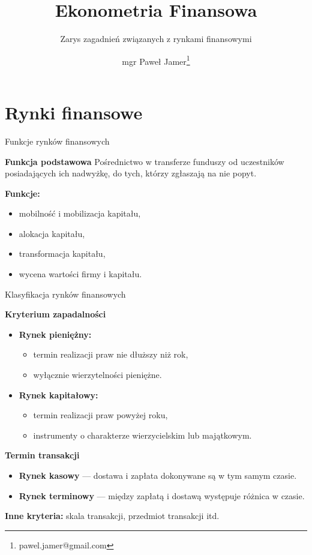 \documentclass[a4paper, 11pt]{beamer}
\title{Ekonometria Finansowa}
\subtitle{Zarys zagadnień związanych z rynkami finansowymi}
\author{mgr Paweł Jamer\thanks{pawel.jamer@gmail.com}}
\begin{document}
	\begin{frame}
		\titlepage
	\end{frame}
	
	\section{Rynki finansowe}

	\begin{frame}{Funkcje rynków finansowych}
		\begin{block}{\textbf{Funkcja podstawowa}}
			Pośrednictwo w transferze funduszy od uczestników posiadających ich nadwyżkę,
			do tych, którzy zgłaszają na nie popyt.
		\end{block}
		\textbf{Funkcje:}
		\begin{itemize}
			\item mobilność i mobilizacja kapitału,
			\item alokacja kapitału,
			\item transformacja kapitału,
			\item wycena wartości firmy i kapitału.
		\end{itemize}
	\end{frame}
	
	\begin{frame}{Klasyfikacja rynków finansowych}
		\begin{block}{\textbf{Kryterium zapadalności}}
			\begin{itemize}
				\item \textbf{Rynek pieniężny:}
				\begin{itemize}
					\item termin realizacji praw nie dłuższy niż rok,
					\item wyłącznie wierzytelności pieniężne.
				\end{itemize}
				\item \textbf{Rynek kapitałowy:}
				\begin{itemize}
					\item termin realizacji praw powyżej roku,
					\item instrumenty o charakterze wierzycielskim lub majątkowym.
				\end{itemize}
			\end{itemize}
		\end{block}
		\begin{block}{\textbf{Termin transakcji}}
			\begin{itemize}
				\item \textbf{Rynek kasowy} --- dostawa i zapłata dokonywane są w tym samym czasie.
				\item \textbf{Rynek terminowy} --- między zapłatą i dostawą występuje różnica w czasie.
			\end{itemize}
		\end{block}
		\textbf{Inne kryteria:} skala transakcji, przedmiot transakcji itd.
	\end{frame}
	
\end{document}
